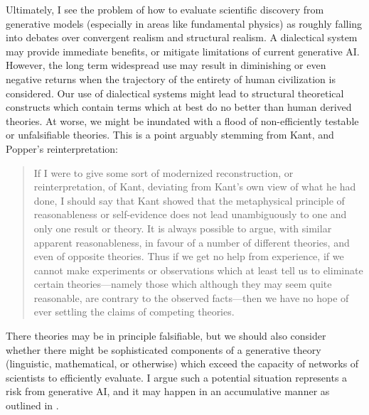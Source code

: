 \documentclass[11pt, oneside]{article}   	%
\begin{document}
Ultimately, I see the problem of how to evaluate  scientific discovery from generative models (especially in areas like fundamental physics) as roughly falling into debates over convergent realism and structural realism.  A dialectical system may provide immediate benefits, or mitigate limitations of current generative AI.  However, the long term widespread use may result in diminishing or even negative returns when the trajectory of the entirety of human civilization is considered.  Our use of dialectical systems might lead to structural theoretical constructs which contain terms which at best do no better than human derived theories.  At worse, we might be inundated with a flood of non-efficiently testable or unfalsifiable theories.  This is a point arguably stemming from Kant, and Popper's reinterpretation:

\begin{quote}
    If I were to give some sort of modernized reconstruction, or reinterpretation, of Kant, deviating from Kant’s own view of what he had done, I should say that Kant showed that the metaphysical principle of reasonableness or self-evidence does not lead unambiguously to one and only one result or theory. It is always possible to argue, with similar apparent reasonableness, in favour of a number of different theories, and even of opposite theories. Thus if we get no help from experience, if we cannot make experiments or observations which at least tell us to eliminate certain theories—namely those which although they may seem quite reasonable, are contrary to the observed facts—then we have no hope of ever settling the claims of competing theories.
    \citep[p. 439]{PopperCR1963}
\end{quote}




There theories may be in principle falsifiable, but we should also consider whether there might be sophisticated components of a generative theory (linguistic, mathematical, or otherwise) which exceed the capacity of networks of scientists to efficiently evaluate.  I argue such a potential situation represents a risk from generative AI, and it may happen in an accumulative manner as outlined in \citep{Kasirzadeh2024WIP}.  
\end{document}
